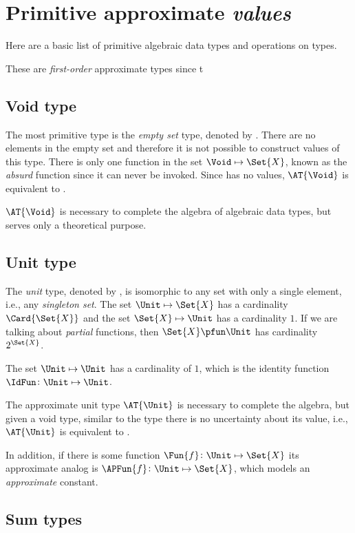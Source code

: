 \documentclass[ ../main.tex]{subfiles}
\begin{document}
\section{Primitive approximate \emph{values}}
Here are a basic list of primitive algebraic data types and operations on types.

These are \emph{first-order} approximate types since t

\subsection{Void type}
The most primitive type is the \emph{empty set} type, denoted by \Void.
There are no elements in the empty set and therefore it is not possible to construct values of this type.
There is only one function in the set $\Void \mapsto \Set{X}$, known as the \emph{absurd} function since it can never be invoked.
Since \Void has no values, $\AT{\Void}$ is equivalent to \Void.

$\AT{\Void}$ is necessary to complete the algebra of algebraic data types, but serves only a theoretical purpose.

\subsection{Unit type}
The \emph{unit} type, denoted by \Unit, is isomorphic to any set with only a single element, i.e., any \emph{singleton set}.
The set $\Unit \mapsto \Set{X}$ has a cardinality $\Card{\Set{X}}$ and the set $\Set{X} \mapsto \Unit$ has a cardinality $1$.
If we are talking about \emph{partial} functions, then $\Set{X} \pfun \Unit$ has cardinality $2^{\Set{X}}$.

The set $\Unit \mapsto \Unit$ has a cardinality of $1$, which is the identity function $\IdFun \colon \Unit \mapsto \Unit$.

The approximate unit type $\AT{\Unit}$ is necessary to complete the algebra, but given a void \Unit type, similar to the \Void type there is no uncertainty about its value, i.e., $\AT{\Unit}$ is equivalent to \Unit.

In addition, if there is some function $\Fun{f} \colon \Unit \mapsto \Set{X}$ its approximate analog is $\APFun{f} \colon \Unit \mapsto \Set{X}$, which models an \emph{approximate} constant.

\subsection{Sum types}
\end{document}
